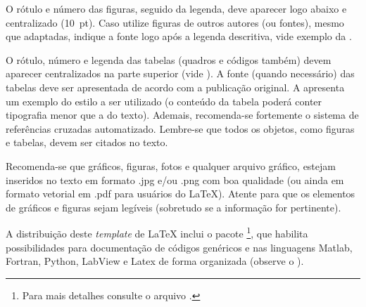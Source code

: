 %
\vspace{-3mm}
O rótulo e número das figuras, seguido da legenda, deve aparecer logo abaixo e centralizado (10~pt). Caso utilize figuras de outros autores (ou fontes), mesmo que adaptadas, indique a fonte logo após a legenda descritiva, vide exemplo da .

O rótulo, número e legenda das tabelas (quadros e códigos também) devem aparecer centralizados na parte superior (vide ). A fonte (quando necessário) das tabelas deve ser apresentada de acordo com a publicação original. A  apresenta um exemplo do estilo a ser utilizado (o conteúdo da tabela poderá conter tipografia menor que a do texto). Ademais, recomenda-se fortemente o sistema de referências cruzadas automatizado. Lembre-se que todos os objetos, como figuras e tabelas, devem ser citados no texto.
%

%



Recomenda-se que gráficos, figuras, fotos e qualquer arquivo gráfico, estejam inseridos no texto em formato .jpg e/ou .png com boa qualidade (ou ainda em formato vetorial em .pdf para usuários do \LaTeX\xspace). Atente para que os elementos de gráficos e figuras sejam legíveis (sobretudo se a informação for pertinente).

A distribuição deste \textit{template} de \LaTeX\xspace inclui o pacote \footnote{Para mais detalhes consulte o arquivo .}, que habilita possibilidades para documentação de códigos genéricos e nas linguagens Matlab, Fortran, Python, LabView e Latex de forma organizada (observe o ).
%

